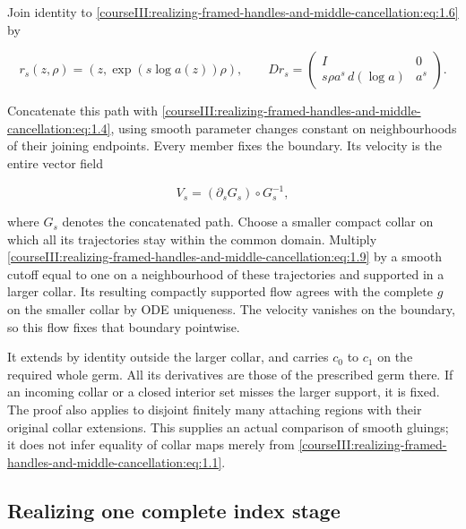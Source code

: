Join identity to \eqref{courseIII:realizing-framed-handles-and-middle-cancellation:eq:1.6} by

\begin{equation}
r_s(z,\rho)=(z,\exp(s\log a(z))\rho),\qquad
 Dr_s=
 \begin{pmatrix}
 I&0\\
 s\rho a^s\,d(\log a)&a^s
 \end{pmatrix}.
 \label{courseIII:realizing-framed-handles-and-middle-cancellation:eq:1.8}
\end{equation}

Concatenate this path with \eqref{courseIII:realizing-framed-handles-and-middle-cancellation:eq:1.4}, using smooth parameter changes constant on neighbourhoods of their joining endpoints. Every member fixes the boundary. Its velocity is the entire vector field

\begin{equation}
V_s=(\partial_s G_s)\circ G_s^{-1},
 \label{courseIII:realizing-framed-handles-and-middle-cancellation:eq:1.9}
\end{equation}

where \(G_s\) denotes the concatenated path. Choose a smaller compact collar on which all its trajectories stay within the common domain. Multiply \eqref{courseIII:realizing-framed-handles-and-middle-cancellation:eq:1.9} by a smooth cutoff equal to one on a neighbourhood of these trajectories and supported in a larger collar. Its resulting compactly supported flow agrees with the complete \(g\) on the smaller collar by ODE uniqueness. The velocity vanishes on the boundary, so this flow fixes that boundary pointwise.

It extends by identity outside the larger collar, and carries \(c_0\) to \(c_1\) on the required whole germ. All its derivatives are those of the prescribed germ there. If an incoming collar or a closed interior set misses the larger support, it is fixed. The proof also applies to disjoint finitely many attaching regions with their original collar extensions. This supplies an actual comparison of smooth gluings; it does not infer equality of collar maps merely from \eqref{courseIII:realizing-framed-handles-and-middle-cancellation:eq:1.1}.

\subsection{Realizing one complete index stage}
\label{courseIII:realizing-framed-handles-and-middle-cancellation:middle-realize-stage}

